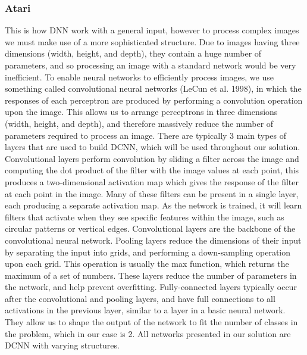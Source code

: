 \documentclass[12pt,a4paper]{article}
\begin{document}
\subsubsection{Atari}
This is how DNN work with a general input, however to process complex images we
must make use of a more sophisticated structure. Due to images having three dimensions
(width, height, and depth), they contain a huge number of parameters, and so processing an
image with a standard network would be very inefficient. To enable neural networks to
efficiently process images, we use something called convolutional neural networks (LeCun et
al. 1998), in which the responses of each perceptron are produced by performing a
convolution operation upon the image. This allows us to arrange perceptrons in three
dimensions (width, height, and depth), and therefore massively reduce the number of
parameters required to process an image.
There are typically 3 main types of layers that are used to build DCNN, which will be
used throughout our solution. Convolutional layers perform convolution by sliding a filter
across the image and computing the dot product of the filter with the image values at each
point, this produces a two-dimensional activation map which gives the response of the filter
at each point in the image. Many of these filters can be present in a single layer, each
producing a separate activation map. As the network is trained, it will learn filters that
activate when they see specific features within the image, such as circular patterns or vertical
edges. Convolutional layers are the backbone of the convolutional neural network. Pooling
layers reduce the dimensions of their input by separating the input into grids, and performing
a down-sampling operation upon each grid. This operation is usually the max function, which
returns the maximum of a set of numbers. These layers reduce the number of parameters in
the network, and help prevent overfitting. Fully-connected layers typically occur after the
convolutional and pooling layers, and have full connections to all activations in the previous
layer, similar to a layer in a basic neural network. They allow us to shape the output of the
network to fit the number of classes in the problem, which in our case is 2.
All networks presented in our solution are DCNN with varying structures.
\end{document}
